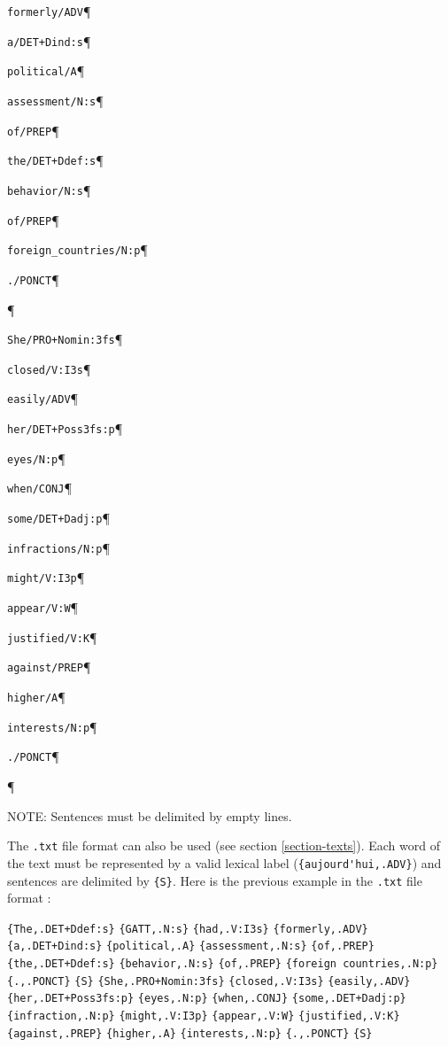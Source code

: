 \verb+formerly/ADV+\P

\verb$a/DET+Dind:s$\P

\verb+political/A+\P

\verb+assessment/N:s+\P

\verb+of/PREP+\P

\verb$the/DET+Ddef:s$\P

\verb+behavior/N:s+\P

\verb+of/PREP+\P

\verb+foreign_countries/N:p+\P

\verb+./PONCT+\P

\P

\verb$She/PRO+Nomin:3fs$\P

\verb+closed/V:I3s+\P

\verb+easily/ADV+\P

\verb$her/DET+Poss3fs:p$\P

\verb+eyes/N:p+\P

\verb+when/CONJ+\P

\verb$some/DET+Dadj:p$\P

\verb+infractions/N:p+\P

\verb+might/V:I3p+\P

\verb+appear/V:W+\P

\verb+justified/V:K+\P

\verb+against/PREP+\P

\verb+higher/A+\P

\verb+interests/N:p+\P

\verb+./PONCT+\P

\P

\bigskip
\noindent NOTE: Sentences must be delimited by empty lines.

\bigskip
The \verb+.txt+ file format can also be used (see section \ref{section-texts}). Each word of the text 
must be represented by a valid lexical label (\verb+{aujourd'hui,.ADV}+) and sentences
are delimited by  \verb+{S}+.
Here is the previous example in the \verb+.txt+ file format :

\bigskip
\verb${The,.DET+Ddef:s}$ \verb${GATT,.N:s}$ \verb${had,.V:I3s}$ \verb${formerly,.ADV}$\\ 
\verb${a,.DET+Dind:s}$ \verb${political,.A}$ \verb${assessment,.N:s}$ \verb${of,.PREP}$\\ 
\verb${the,.DET+Ddef:s}$ \verb${behavior,.N:s}$ \verb${of,.PREP}$ \verb${foreign countries,.N:p}$\\ 
\verb${.,.PONCT}$ \verb${S}$ \verb${She,.PRO+Nomin:3fs}$ \verb${closed,.V:I3s}$ \verb${easily,.ADV}$\\
\verb${her,.DET+Poss3fs:p}$ \verb${eyes,.N:p}$ \verb${when,.CONJ}$ \verb${some,.DET+Dadj:p}$\\
\verb${infraction,.N:p}$ \verb${might,.V:I3p}$ \verb${appear,.V:W}$ \verb${justified,.V:K}$\\
\verb${against,.PREP}$ \verb${higher,.A}$ \verb${interests,.N:p}$ \verb${.,.PONCT}$ \verb${S}$

